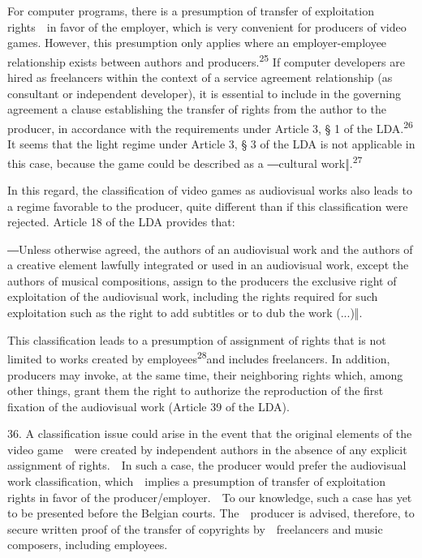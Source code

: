 \documentclass[
]{article}
\begin{document}
{For computer programs, there is a presumption of transfer of
exploitation rights~~in favor of the employer, which is very convenient
for producers of video games. However, this presumption only applies
where an employer-employee relationship exists between authors and
producers.}\textsuperscript{{25 }}{If computer developers are hired as
freelancers within the context of a service agreement relationship (as
consultant or independent developer), it is essential to include in the
governing agreement a clause establishing the transfer of rights from
the author to the producer, in accordance with the requirements under
Article 3, § 1 of the LDA.}\textsuperscript{{26 }}{It seems that the
light regime under Article 3, § 3 of the LDA is not }{applicable in this
case, because the game could be described as a ―}{cultural
}{work‖}{.}\textsuperscript{{27}}

{In this regard, the classification of video games as audiovisual works
also leads to a regime favorable to the producer, quite different than
if this classification were rejected. Article 18 of the LDA provides
that:}

{―}{Unless otherwise agreed, the authors of an audiovisual work and the
authors of a creative element lawfully integrated or used in an
audiovisual work, except the authors of musical compositions, assign to
the producers the exclusive right of exploitation of the audiovisual
work, including the rights required for such exploitation such as the
right to add subtitles or to dub the work (...)}{‖.}

{This classification leads to a presumption of assignment of rights that
is not limited to works created by employees}\textsuperscript{{28}}{and
includes freelancers. In addition, producers may invoke, at the same
time, their neighboring rights which, among other things, grant them the
right to authorize the reproduction of the first fixation of the
audiovisual work (Article 39 of the LDA).}

{36. }{A classification issue could arise in the event that the original
elements of the video game~~were created by independent authors in the
absence of any explicit assignment of rights.~~In such a case, the
producer would prefer the audiovisual work classification,
which~~implies a presumption of transfer of exploitation rights in favor
of the producer/employer.~~To our knowledge, such a case has yet to be
presented before the Belgian courts. The~~producer is advised,
therefore, to secure written proof of the transfer of copyrights
by~~freelancers and music composers, including employees.}
\end{document}

